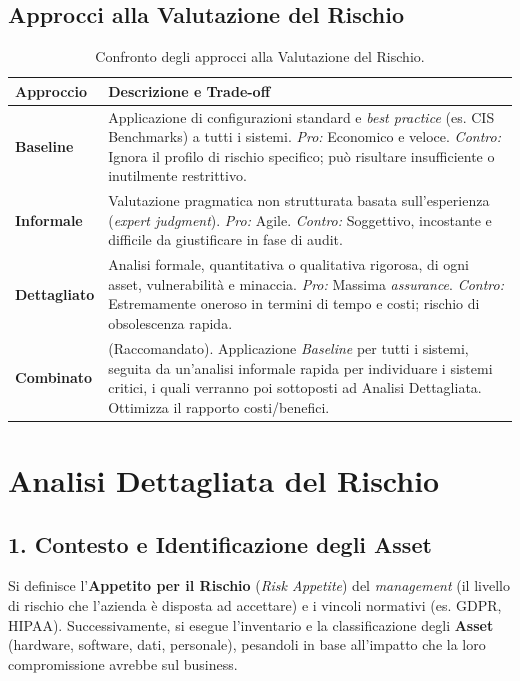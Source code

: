 \subsection{Approcci alla Valutazione del Rischio}
\begin{table}[htbp]
\centering
\begin{tabularx}{\textwidth}{@{}lX@{}}
\toprule
\textbf{Approccio} & \textbf{Descrizione e Trade-off} \\ \midrule
\textbf{Baseline} & Applicazione di configurazioni standard e \textit{best practice} (es. CIS Benchmarks) a tutti i sistemi. \textit{Pro:} Economico e veloce. \textit{Contro:} Ignora il profilo di rischio specifico; può risultare insufficiente o inutilmente restrittivo. \\ \addlinespace
\textbf{Informale} & Valutazione pragmatica non strutturata basata sull'esperienza (\textit{expert judgment}). \textit{Pro:} Agile. \textit{Contro:} Soggettivo, incostante e difficile da giustificare in fase di audit. \\ \addlinespace
\textbf{Dettagliato} & Analisi formale, quantitativa o qualitativa rigorosa, di ogni asset, vulnerabilità e minaccia. \textit{Pro:} Massima \textit{assurance}. \textit{Contro:} Estremamente oneroso in termini di tempo e costi; rischio di obsolescenza rapida. \\ \addlinespace
\textbf{Combinato} & (Raccomandato). Applicazione \textit{Baseline} per tutti i sistemi, seguita da un'analisi informale rapida per individuare i sistemi critici, i quali verranno poi sottoposti ad Analisi Dettagliata. Ottimizza il rapporto costi/benefici. \\ \bottomrule
\end{tabularx}
\caption{Confronto degli approcci alla Valutazione del Rischio.}
\label{tab:risk_approaches}
\end{table}

\section{Analisi Dettagliata del Rischio}
\subsection{1. Contesto e Identificazione degli Asset}
Si definisce l'\textbf{Appetito per il Rischio} (\textit{Risk Appetite}) del \textit{management} (il livello di rischio che l'azienda è disposta ad accettare) e i vincoli normativi (es. GDPR, HIPAA). Successivamente, si esegue l'inventario e la classificazione degli \textbf{Asset} (hardware, software, dati, personale), pesandoli in base all'impatto che la loro compromissione avrebbe sul business.

